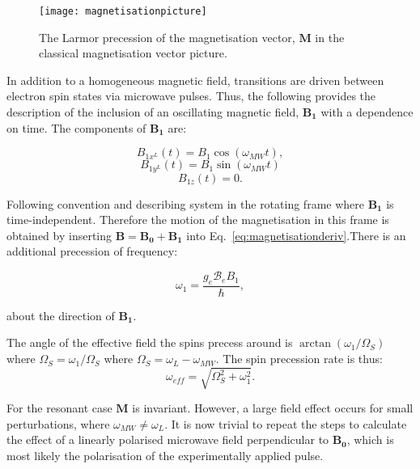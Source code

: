 \begin{figure}[h]
\centering
\texttt{[image: magnetisationpicture]}
\caption{\label{fig:magnetisationpicture} The Larmor precession of the magnetisation vector, $\bm{M}$ in the classical magnetisation vector picture.}
\end{figure}
 
 
In addition to a homogeneous magnetic field, transitions are driven between electron spin states via microwave pulses. Thus, the following provides the description of the inclusion of an oscillating magnetic field, $\bm{B_{1}}$ with a dependence on time. The components of $\bm{B_{1}}$ are:

\begin{equation}
\label{eq:magneticfieldcomponentsx}
B_{1x^{L}}(t) = B_{1}\cos(\omega_{MW}t),
\end{equation}
\begin{equation}
\label{eq:magneticfieldcomponentsy}
B_{1y^{L}}(t)=B_{1}\sin(\omega_{MW}t)
\end{equation}
\begin{equation}
\label{eq:magneticfieldcomponentsz}
B_{1z}(t) = 0.
\end{equation}
 
\noindent Following convention and describing system in the rotating frame where $\bm{B_{1}}$ is time-independent. Therefore the motion of the magnetisation in this frame is obtained by inserting $\bm{B} = \bm{B_{0}}+\bm{B_{1}}$ into Eq.~\ref{eq:magnetisationderiv}.There is an additional precession of frequency:

\begin{equation}
\label{eq:mwfieldirect}
\omega_{1}= \frac{g_{e}\mathcal{B}_{e} B_{1}}{\hbar},
\end{equation}

\noindent about the direction of $\bm{B_{1}}$.

The angle of the effective field the spins precess around is $\arctan(\omega_{1}/\Omega_{S})$ where $\Omega_{S} = \omega_{1}/\Omega_{S}$ where $\Omega_{S}= \omega_{L}-\omega_{MW}$. The spin precession rate is thus: 
\begin{equation}
\label{eq:mwfieldirecteffect}
\omega_{eff}=\sqrt{\Omega_{S}^{2}+\omega_{1}^{2}}.
\end{equation}

\noindent For the resonant case $\bm{M}$ is invariant. However, a large field effect occurs for small perturbations, where $\omega_{MW} \neq \omega_{L}$. It is now trivial to repeat the steps to calculate the effect of a linearly polarised microwave field perpendicular to $\bm{B_{0}}$, which is most likely the polarisation of the experimentally applied pulse. 




